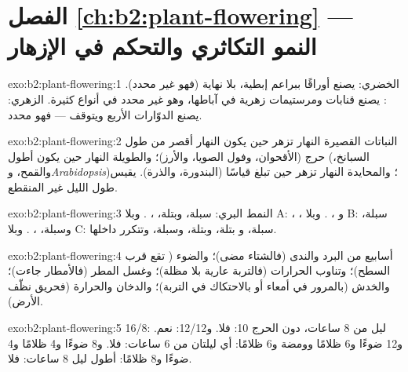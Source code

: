 \section*{الفصل \ref{ch:b2:plant-flowering} --- النمو التكاثري والتحكم في الإزهار}

\begin{solution}{exo:b2:plant-flowering:1}
 الخضري: يصنع أوراقًا ببراعم إبطية، بلا نهاية
(فهو غير محدد). : يصنع قنابات ومرستيمات
زهرية في آباطها، وهو غير محدد في أنواع كثيرة. 
الزهري: يصنع الدوّارات الأربع ويتوقف --- فهو محدد.
\end{solution}

\begin{solution}{exo:b2:plant-flowering:2}
النباتات القصيرة النهار تزهر حين يكون النهار أقصر من طول
حرج (الأقحوان، وفول الصويا، والأرز)؛ والطويلة النهار حين يكون
أطول (السبانخ، والقمح، و\emph{Arabidopsis})؛ والمحايدة النهار
تزهر حين تبلغ قياسًا (البندورة، والذرة). 
يقيس طول الليل غير المنقطع.
\end{solution}

\begin{solution}{exo:b2:plant-flowering:3}
النمط البري: سبلة، وبتلة، ، . وبلا A: ، ، و
، . وبلا B: سبلة، وسبلة، ، . وبلا C: سبلة، و
بتلة، وبتلة، وسبلة، وتتكرر  داخلها.
\end{solution}

\begin{solution}{exo:b2:plant-flowering:4}
أسابيع من البرد والندى (فالشتاء مضى)؛ والضوء ( تقع
قرب السطح)؛ وتناوب الحرارات (فالتربة عارية بلا مظلة)؛
وغسل المطر (فالأمطار جاءت)؛ والخدش (بالمرور
في أمعاء أو بالاحتكاك في التربة)؛ والدخان والحرارة (فحريق
نظّف الأرض).
\end{solution}

\begin{solution}{exo:b2:plant-flowering:5}
16/8: ليل من 8 ساعات، دون الحرج 10: فلا. و12/12: نعم.
و12 ضوءًا و6 ظلامًا وومضة و6 ظلامًا: أي ليلتان من 6 ساعات: فلا.
و8 ضوءًا و4 ظلامًا و4 ضوءًا و8 ظلامًا: أطول ليل 8 ساعات: فلا.
\end{solution}

